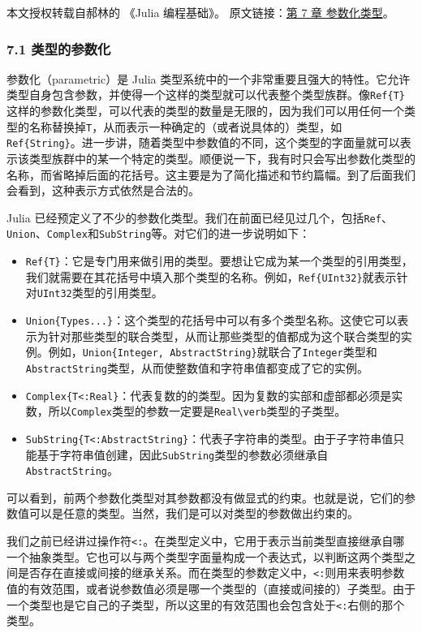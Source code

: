 
本文授权转载自郝林的 《Julia 编程基础》。 原文链接：\href{https://github.com/hyper0x/JuliaBasics/blob/master/book/ch07.md}{第 7 章 参数化类型}。


\subsubsection{7.1 类型的参数化}

参数化（parametric）是 Julia 类型系统中的一个非常重要且强大的特性。它允许类型自身包含参数，并使得一个这样的类型就可以代表整个类型族群。像\verb|Ref{T}|这样的参数化类型，可以代表的类型的数量是无限的，因为我们可以用任何一个类型的名称替换掉\verb|T|，从而表示一种确定的（或者说具体的）类型，如\verb|Ref{String}|。进一步讲，随着类型中参数值的不同，这个类型的字面量就可以表示该类型族群中的某一个特定的类型。顺便说一下，我有时只会写出参数化类型的名称，而省略掉后面的花括号。这主要是为了简化描述和节约篇幅。到了后面我们会看到，这种表示方式依然是合法的。

Julia 已经预定义了不少的参数化类型。我们在前面已经见过几个，包括\verb|Ref|、\verb|Union|、\verb|Complex|和\verb|SubString|等。对它们的进一步说明如下：

\begin{itemize}
\item \verb|Ref{T}|：它是专门用来做引用的类型。要想让它成为某一个类型的引用类型，我们就需要在其花括号中填入那个类型的名称。例如，\verb|Ref{UInt32}|就表示针对\verb|UInt32|类型的引用类型。
\item \verb|Union{Types...}|：这个类型的花括号中可以有多个类型名称。这使它可以表示为针对那些类型的联合类型，从而让那些类型的值都成为这个联合类型的实例。例如，\verb|Union{Integer, AbstractString}|就联合了\verb|Integer|类型和\verb|AbstractString|类型，从而使整数值和字符串值都变成了它的实例。
\item \verb|Complex{T<:Real}|：代表复数的的类型。因为复数的实部和虚部都必须是实数，所以\verb|Complex|类型的参数一定要是\verb|Real\verb|类型的子类型。
\item \verb|SubString{T<:AbstractString}|：代表子字符串的类型。由于子字符串值只能基于字符串值创建，因此\verb|SubString|类型的参数必须继承自\verb|AbstractString|。
\end{itemize}

可以看到，前两个参数化类型对其参数都没有做显式的约束。也就是说，它们的参数值可以是任意的类型。当然，我们是可以对类型的参数做出约束的。

我们之前已经讲过操作符\verb|<:|。在类型定义中，它用于表示当前类型直接继承自哪一个抽象类型。它也可以与两个类型字面量构成一个表达式，以判断这两个类型之间是否存在直接或间接的继承关系。而在类型的参数定义中，\verb|<:|则用来表明参数值的有效范围，或者说参数值必须是哪一个类型的（直接或间接的）子类型。由于一个类型也是它自己的子类型，所以这里的有效范围也会包含处于\verb|<:|右侧的那个类型。

